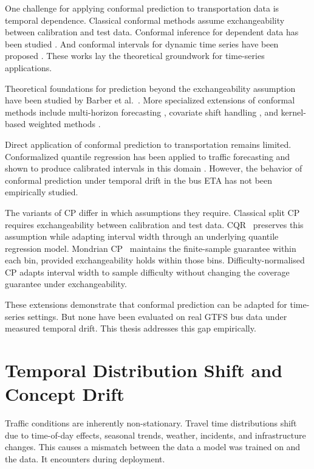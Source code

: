\documentclass[12pt, a4paper, oneside]{report}
\begin{document}
One challenge for applying conformal prediction to transportation data is temporal dependence. Classical conformal methods assume exchangeability between calibration and test data. Conformal inference for dependent data has been studied \cite{Chernozhukov2018732}. And conformal intervals for dynamic time series have been proposed \cite{Xu202111559}. These works lay the theoretical groundwork for time-series applications.

Theoretical foundations for prediction beyond the exchangeability assumption have been studied by Barber et al.~\cite{Barber2023816}. More specialized extensions of conformal methods include multi-horizon forecasting \cite{Lopes2024345}, covariate shift handling \cite{Jonkers2024406}, and kernel-based weighted methods \cite{Lee202565354}.

Direct application of conformal prediction to transportation remains limited. Conformalized quantile regression has been applied to traffic forecasting and shown to produce calibrated intervals in this domain \cite{Petelin2024}. However, the behavior of conformal prediction under temporal drift in the bus ETA has not been empirically studied.

The variants of CP differ in which assumptions they require. Classical split CP requires exchangeability between calibration and test data. CQR~\cite{Romano2019} preserves this assumption while adapting interval width through an underlying quantile regression model. Mondrian CP~\cite{vovk2003mondrian} maintains the finite-sample guarantee within each bin, provided exchangeability holds within those bins. Difficulty-normalised CP adapts interval width to sample difficulty without changing the coverage guarantee under exchangeability.

These extensions demonstrate that conformal prediction can be adapted for time-series settings. But none have been evaluated on real GTFS bus data under measured temporal drift. This thesis addresses this gap empirically.

\section{Temporal Distribution Shift and Concept Drift}

Traffic conditions are inherently non-stationary. Travel time distributions shift due to time-of-day effects, seasonal trends, weather, incidents, and infrastructure changes. This causes a mismatch between the data a model was trained on and the data. It encounters during deployment.
\end{document}
